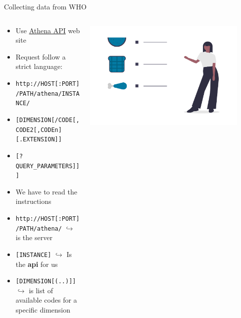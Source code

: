 \documentclass[xcolor=x11names, aspectratio=169, compress]{beamer}
\renewcommand{\(}{\begin{columns}}
\renewcommand{\)}{\end{columns}}
\newcommand{\<}[1]{\begin{column}{#1}}
\renewcommand{\>}{\end{column}}
\begin{document}
\begin{frame}{Collecting data from WHO}
\begin{columns}[T]
  \begin{column}{0.8\textwidth}
    \begin{itemize}[<+->]
        \item Use \href{https://www.who.int/data/gho/info/athena-api}{Athena API} web site
        \item Request follow a strict language:
        \item[] \small{\texttt{http://HOST[:PORT]/PATH/athena/INSTANCE/}}
        \item[] \small{\texttt{[DIMENSION[/CODE[,CODE2[,CODEn][.EXTENSION]]}}
        \item[] \small{\texttt{[?QUERY\_PARAMETERS]]]}}
        \item We have to read the instructions
        \item[ ] \small{\texttt{http://HOST[:PORT]/PATH/athena/}} $\hookrightarrow$ is the server
        \item[]\small{\texttt{[INSTANCE]}} $\hookrightarrow$ Is the \textbf{api} for us
        \item[]\small{\texttt{[DIMENSION[(..)]]}} $\hookrightarrow$ is list of available codes for a specific dimension
     \end{itemize}
     \end{column}

    \begin{column}{0.2\textwidth}
    \begin{center}
      \includegraphics[width=0.9\textwidth]{undraw_diet_ghvw.png}
    \end{center}
    \end{column}
\end{columns}
\end{frame}
\end{document}
